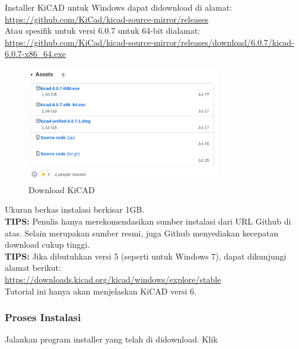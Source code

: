 \documentclass[12pt]{book}
\begin{document}
	Installer KiCAD untuk Windows dapat didownload di alamat:\\
	\url{https://github.com/KiCad/kicad-source-mirror/releases}\\

	Atau spesifik untuk versi 6.0.7 untuk 64-bit dialamat:\\
	\url{https://github.com/KiCad/kicad-source-mirror/releases/download/6.0.7/kicad-6.0.7-x86_64.exe}\\

	\begin{figure}[!ht]
		\centering
		\includegraphics[width=0.75\textwidth]{images/installations/kicad_github}
		\caption{Download KiCAD}
	\end{figure}

	Ukuran berkas instalasi berkisar 1GB.\\

	\textbf{TIPS:} Penulis hanya merekomendasikan sumber instalasi dari URL Github di atas.
	Selain merupakan sumber resmi, juga Github menyediakan kecepatan download cukup tinggi.\\

	\textbf{TIPS:} Jika dibutuhkan versi 5 (seperti untuk Windows 7), dapat dikunjungi alamat berikut:\\
	\url{https://downloads.kicad.org/kicad/windows/explore/stable}\\

	Tutorial ini hanya akan menjelaskan KiCAD versi 6.

	\newpage
	\subsubsection{Proses Instalasi}

	Jalankan program installer yang telah di didownload. Klik 
\end{document}
